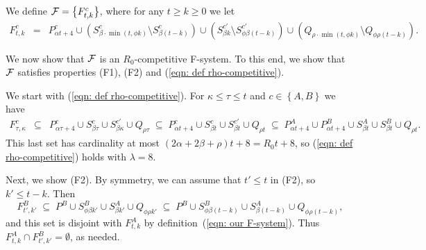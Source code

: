 \documentclass[11pt]{article}
\newcommand{\calF}{{\cal F}}
\newcommand{\braced}[1]{{ \left\{ #1 \right\} }}
\newcommand{\bigbrace}[1]{{ \big\{ #1 \big\} }}
\begin{document}
We define $\calF = \bigbrace{ F^c_{t,k} }$, where for 
any $t\geq k\geq 0$ we let
\begin{eqnarray}
F^c_{t,k} &=& P^c_{\alpha t+4} 
			\cup  (S^c_{\beta\cdot\min(t,\phi k)} \setminus S^c_{\beta(t-k)})
			\cup (S^{c'}_{\beta k} \setminus S^{c'}_{\phi\beta(t-k)})
			\cup  (Q_{\rho\cdot\min(t,\phi k)} \setminus Q_{\phi\rho(t-k)}).
			\label{eqn: our F-system}
\end{eqnarray}

We now show that $\calF$ is an $R_0$-competitive F-system. To this end, 
we show that $\calF$ satisfies properties (F1), (F2) and
(\ref{eqn: def rho-competitive}).

We start with (\ref{eqn: def rho-competitive}).
For $\kappa\le \tau \le t$ and $c\in\braced{A,B}$ we have
\begin{eqnarray*}
F^c_{\tau,\kappa} &\subseteq& P^c_{\alpha\tau+4} \cup S^c_{\beta \tau}
\cup S^{c'}_{\beta \kappa} \cup Q_{\rho\tau}
		\;\subseteq\; P^c_{\alpha t+4} \cup S^c_{\beta t} \cup
                S^{c'}_{\beta t}\cup Q_{\rho t}
		\;\subseteq\; P^A_{\alpha t+4} \cup P^B_{\alpha t+4}
						\cup S^A_{\beta t} \cup S^B_{\beta t}\cup Q_{\rho t}.
\end{eqnarray*}
This last set has cardinality at most
$(2\alpha+2\beta+\rho)t+8 = R_0t+8$,  
so (\ref{eqn: def rho-competitive}) holds with $\lambda = 8$.

\smallskip

Next, we show (F2). By symmetry, we can assume that $t'\le t$ in (F2),
so $k' \le t-k$. Then
\[
F^{B}_{t',k'} 
	\;\subseteq\; P^{B} \cup S^{B}_{\phi\beta k'}\cup S^A_{\beta k'}\cup Q_{\phi\rho k'}
	\;\subseteq\; P^{B} \cup S^{B}_{\phi\beta (t-k)}\cup S^A_{\beta(t-k)}\cup Q_{\phi\rho(t-k)},
\]
and this set is disjoint with $F^A_{t,k}$ by definition~(\ref{eqn: our F-system}). 
Thus $F^A_{t,k}\cap F^{B}_{t',k'} = \emptyset$, as needed.

\smallskip
\end{document}
